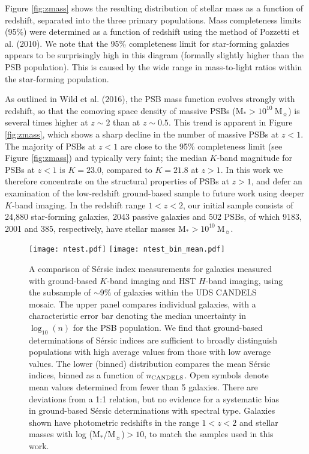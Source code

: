 \documentclass[a4paper,fleqn,usenatbib,useAMS]{mnras}
\begin{document}
Figure \ref{fig:zmass} shows the resulting distribution of
stellar mass as a function of redshift, separated into the three
primary populations. 
Mass completeness limits (95\%) were determined
as a function of redshift using the method of Pozzetti et
al. (2010). We note that the 95\% completeness limit for star-forming
galaxies appears to be surprisingly high in this diagram (formally
slightly higher than the PSB population). This is caused by the 
wide range in mass-to-light ratios within the star-forming population.


As outlined in Wild et al. (2016), the PSB mass function evolves
strongly with redshift, so that the comoving space density of massive
PSBs (M$_{\ast}> 10^{10} ~$M$_{\sun}$) is several times higher at
$z\sim 2$ than at $z\sim 0.5$. This trend is apparent in Figure
\ref{fig:zmass}, which shows a sharp decline in the number of massive
PSBs at $z<1$. The majority of PSBs at $z<1$ are close to the 95\%
completeness limit (see Figure \ref{fig:zmass}) and typically very
faint; the median $K$-band magnitude for PSBs at $z<1$ is $K=23.0$,
compared to $K=21.8$ at $z>1$.  In this work we therefore concentrate
on the structural properties of PSBs at $z>1$, and defer an
examination of the low-redshift ground-based sample to future work
using deeper $K$-band imaging. In the redshift range $1<z<2$, our
initial sample consists of 24,880 star-forming galaxies, 2043 passive
galaxies and 502 PSBs, of which 9183, 2001 and 385, respectively, have
stellar masses M$_{\ast}> 10^{10} ~$M$_{\sun}$.



\begin{figure}
	\texttt{[image: ntest.pdf]}
	\texttt{[image: ntest\_bin\_mean.pdf]}
    \caption{ A comparison of S\'{e}rsic index measurements for
      galaxies measured with ground-based $K$-band imaging and HST
      $H$-band imaging, using the subsample of $\sim$9\% of galaxies
      within the UDS CANDELS mosaic.  The upper panel compares
      individual galaxies, with a characteristic error bar denoting
      the median uncertainty in $\log_{10}(n)$ for the PSB
      population. We find that ground-based determinations of
      S\'{e}rsic indices are sufficient to broadly distinguish
      populations with high average values from those with low average
      values. The lower (binned) distribution compares the mean
      S\'{e}rsic indices, binned as a function of $n_{\rm
        CANDELS}$. Open symbols denote mean values determined from
      fewer than 5 galaxies.  There are deviations from a 1:1
      relation, but no evidence for a systematic bias in ground-based
      S\'{e}rsic determinations with spectral type.  Galaxies shown
      have photometric redshifts in the range $1<z<2$ and stellar
      masses with log (M$_{\ast}$/M$_{\sun}$)$>10$, to match the
      samples used in this work.  }
    \label{fig:sersic-test}
\end{figure}
\end{document}
